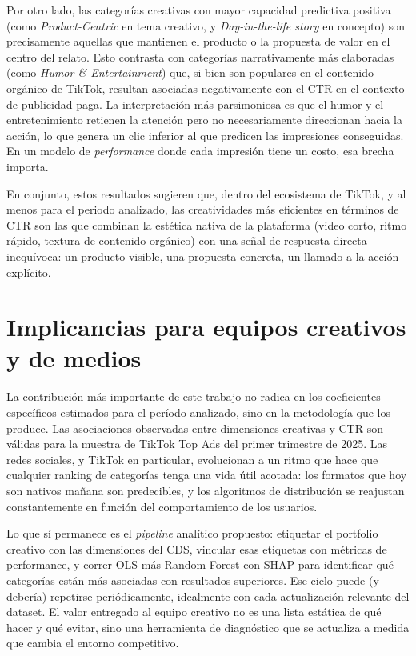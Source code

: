 \documentclass[12pt, a4paper]{report}
\begin{document}
Por otro lado, las categorías creativas con mayor capacidad predictiva positiva (como
\textit{Product-Centric} en tema creativo, y \textit{Day-in-the-life story} en concepto) son
precisamente aquellas que mantienen el producto o la propuesta de valor en el centro del
relato. Esto contrasta con categorías narrativamente más elaboradas (como
\textit{Humor \& Entertainment}) que, si bien son populares en el contenido orgánico de
TikTok, resultan asociadas negativamente con el CTR en el contexto de publicidad paga.
La interpretación más parsimoniosa es que el humor y el entretenimiento retienen la
atención pero no necesariamente direccionan hacia la acción, lo que genera un clic
inferior al que predicen las impresiones conseguidas. En un modelo de
\textit{performance} donde cada impresión tiene un costo, esa brecha importa.

En conjunto, estos resultados sugieren que, dentro del ecosistema de TikTok, y al menos para el periodo analizado, las
creatividades más eficientes en términos de CTR son las que combinan la estética nativa
de la plataforma (video corto, ritmo rápido, textura de contenido orgánico) con una señal
de respuesta directa inequívoca: un producto visible, una propuesta concreta, un llamado
a la acción explícito.

\section{Implicancias para equipos creativos y de medios}

La contribución más importante de este trabajo no radica en los coeficientes específicos
estimados para el período analizado, sino en la metodología que los produce. Las
asociaciones observadas entre dimensiones creativas y CTR son válidas para la muestra de
TikTok Top Ads del primer trimestre de 2025. Las redes sociales, y TikTok en particular,
evolucionan a un ritmo que hace que cualquier ranking de categorías tenga una vida útil
acotada: los formatos que hoy son nativos mañana son predecibles, y los algoritmos de
distribución se reajustan constantemente en función del comportamiento de los usuarios.

Lo que sí permanece es el \textit{pipeline} analítico propuesto: etiquetar el portfolio
creativo con las dimensiones del CDS, vincular esas etiquetas con métricas de performance,
y correr OLS más Random Forest con SHAP para identificar qué categorías están más
asociadas con resultados superiores. Ese ciclo puede (y debería) repetirse periódicamente,
idealmente con cada actualización relevante del dataset. El valor entregado al equipo
creativo no es una lista estática de qué hacer y qué evitar, sino una herramienta de
diagnóstico que se actualiza a medida que cambia el entorno competitivo.
\end{document}
